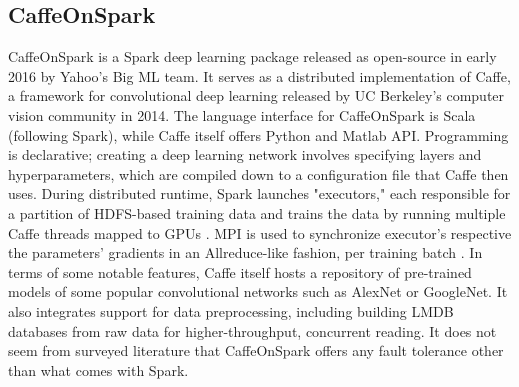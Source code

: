 \documentclass{article}
\begin{document}
\subsection{CaffeOnSpark}
CaffeOnSpark is a Spark deep learning package released as open-source in early 2016 by Yahoo's Big ML team. It serves as a distributed implementation of Caffe, a framework for convolutional deep learning released by UC Berkeley's computer vision community in 2014. The language interface for CaffeOnSpark is Scala (following Spark), while Caffe itself offers Python and Matlab API. Programming is declarative; creating a deep learning network involves specifying layers and hyperparameters, which are compiled down to a configuration file that Caffe then uses. During distributed runtime, Spark launches "executors," each responsible for a partition of HDFS-based training data and trains the data by running multiple Caffe threads mapped to GPUs \cite{Large52:online}. MPI is used to synchronize executor's respective the parameters' gradients in an Allreduce-like fashion, per training batch \cite{Caffe27:online}. In terms of some notable features, Caffe itself hosts a repository of pre-trained models of some popular convolutional networks such as AlexNet or GoogleNet. It also integrates support for data preprocessing, including building LMDB databases from raw data for higher-throughput, concurrent reading. It does not seem from surveyed literature that CaffeOnSpark offers any fault tolerance other than what comes with Spark.
\end{document}
